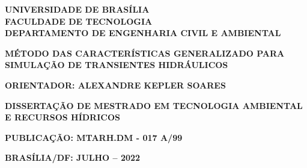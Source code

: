 \thispagestyle{empty}
\setcounter{page}{1}


\doublespacing %
\begin{center}

	
{\fontsize{14}{14}\selectfont \textbf{	UNIVERSIDADE DE BRASÍLIA\\
	FACULDADE DE TECNOLOGIA\\
	DEPARTAMENTO DE ENGENHARIA CIVIL E AMBIENTAL}}

\vfill

{\fontsize{16}{14}\selectfont \textbf{MÉTODO DAS CARACTERÍSTICAS GENERALIZADO PARA SIMULAÇÃO DE TRANSIENTES HIDRÁULICOS}}

\vspace{10mm}

{\fontsize{16}{14}\selectfont {\bf GUSTAVO NASCIMENTO LINS}}


\vfill

{\fontsize{14}{14}\selectfont
	\textbf{ORIENTADOR: ALEXANDRE KEPLER SOARES}
}

\vspace{10mm}

{\fontsize{14}{14}\selectfont
	\textbf{DISSERTAÇÃO DE MESTRADO EM TECNOLOGIA AMBIENTAL E RECURSOS HÍDRICOS}
}
\vspace{10mm}

{\fontsize{14}{14}\selectfont
	\textbf{PUBLICAÇÃO: MTARH.DM - 017 A/99}
}


{\fontsize{14}{14}\selectfont
	\textbf{BRASÍLIA/DF: JULHO – 2022}
}





\end{center}
